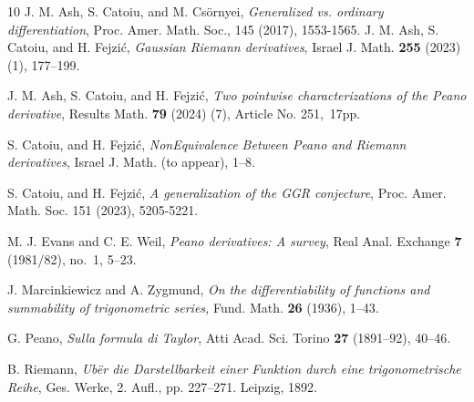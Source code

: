 \documentclass{raex}
\theoremstyle{definition}
\begin{document}
\begin{thebibliography}{10}
 J. M. Ash, S. Catoiu, and M. Csörnyei, \textit{Generalized vs. ordinary differentiation}, Proc. Amer. Math. Soc., 145 (2017), 1553-1565. 
 J. M. Ash, S. Catoiu, and H. Fejzi\'{c}, \textit{Gaussian Riemann derivatives}, Israel J. Math. \textbf{255} (2023) (1), 177--199.

 J. M. Ash, S. Catoiu, and H. Fejzi\'{c}, \textit{Two pointwise characterizations of the Peano derivative}, Results Math. \textbf{79} (2024) (7), Article No. 251,~17pp. %

 S. Catoiu, and H. Fejzi\'{c}, \textit{NonEquivalence Between Peano and Riemann derivatives}, Israel J. Math. (to appear), 1--8.

 S. Catoiu, and H. Fejzi\'{c}, \textit{A generalization of the GGR conjecture}, Proc. Amer. Math. Soc. 151 (2023), 5205-5221.

 M. J. Evans and C. E. Weil, \textit{Peano derivatives: A survey}, Real Anal. Exchange \textbf{7} (1981/82), no.~1, 5--23.

 J. Marcinkiewicz and A. Zygmund, \textit{On the differentiability of functions and summability of trigonometric series,} Fund. Math. \textbf{26} (1936), 1--43.




 G. Peano, \textit{Sulla formula di Taylor}, Atti Acad. Sci. Torino \textbf{27} (1891--92), 40--46.

 B. Riemann, \textit{Ub\"er die Darstellbarkeit einer Funktion durch eine trigonometrische Reihe}, Ges. Werke, 2. Aufl., pp. 227--271. Leipzig, 1892.

\end{thebibliography}
\end{document}
